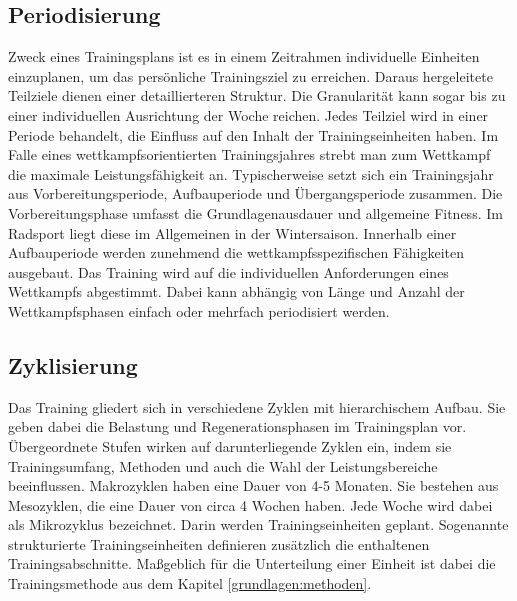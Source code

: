 \subsection{Periodisierung}
Zweck eines Trainingsplans ist es in einem Zeitrahmen individuelle Einheiten einzuplanen, um das persönliche Trainingsziel zu erreichen. Daraus hergeleitete Teilziele dienen einer detaillierteren Struktur. Die Granularität kann sogar bis zu einer individuellen Ausrichtung der Woche reichen. Jedes Teilziel wird in einer Periode behandelt, die Einfluss auf den Inhalt der Trainingseinheiten haben.\cite{periodization} \newline
Im Falle eines wettkampfsorientierten Trainingsjahres strebt man zum Wettkampf die maximale Leistungsfähigkeit an. Typischerweise setzt sich ein Trainingsjahr aus Vorbereitungsperiode, Aufbauperiode und Übergangsperiode zusammen.\cite[279]{Trainingswissenschaft} Die Vorbereitungsphase umfasst die Grundlagenausdauer und allgemeine Fitness. Im Radsport liegt diese im Allgemeinen in der Wintersaison. Innerhalb einer Aufbauperiode werden zunehmend die wettkampfsspezifischen Fähigkeiten ausgebaut. Das Training wird auf die individuellen Anforderungen eines Wettkampfs abgestimmt. Dabei kann abhängig von Länge und Anzahl der Wettkampfsphasen einfach oder mehrfach periodisiert werden.
\subsection{Zyklisierung}
Das Training gliedert sich in verschiedene Zyklen mit hierarchischem Aufbau. Sie geben dabei die Belastung und Regenerationsphasen im Trainingsplan vor. Übergeordnete Stufen wirken auf darunterliegende Zyklen ein, indem sie Trainingsumfang, Methoden und auch die Wahl der Leistungsbereiche beeinflussen. \cite[283]{Trainingswissenschaft}
Makrozyklen haben eine Dauer von 4-5 Monaten. Sie bestehen aus Mesozyklen, die eine Dauer von circa 4 Wochen haben. Jede Woche wird dabei als Mikrozyklus bezeichnet. Darin werden Trainingseinheiten geplant. Sogenannte strukturierte Trainingseinheiten definieren zusätzlich die enthaltenen Trainingsabschnitte. Maßgeblich für die Unterteilung einer Einheit ist dabei die Trainingsmethode aus dem Kapitel \ref{grundlagen:methoden}.

